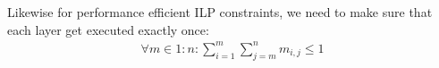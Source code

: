 \documentclass[conference,9pt]{IEEEtran}
\begin{document}
Likewise for performance efficient ILP constraints, we need to make sure that each layer get executed exactly once:
  \begin{equation}
      \begin{split}
\forall m \in {1:n}: \sum_{i=1}^{m}{\sum_{j=m}^{n}{m_{i,j}}} \leq 1
  \end{split}
\end{equation}
\end{document}
